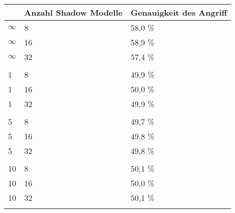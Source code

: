 \begin{table}[!htb]
\centering
\begin{tabular}{lll}
\hline
\rowcolor[HTML]{CBCEFB} 
\multicolumn{1}{|l|}{\cellcolor[HTML]{CBCEFB}Epsilon} &
  \multicolumn{1}{l|}{\cellcolor[HTML]{CBCEFB}Anzahl Shadow Modelle} &
  \multicolumn{1}{l|}{\cellcolor[HTML]{CBCEFB}Genauigkeit des Angriff} \\ \hline
\multicolumn{1}{|l|}{$\infty$} & \multicolumn{1}{l|}{8}  & \multicolumn{1}{l|}{58,0 \%} \\ \hline
\multicolumn{1}{|l|}{$\infty$} & \multicolumn{1}{l|}{16} & \multicolumn{1}{l|}{58,9 \%} \\ \hline
\multicolumn{1}{|l|}{$\infty$} & \multicolumn{1}{l|}{32} & \multicolumn{1}{l|}{57,4 \%} \\ \hline
                               &                         &                              \\ \hline
\multicolumn{1}{|l|}{1}        & \multicolumn{1}{l|}{8}  & \multicolumn{1}{l|}{49,9 \%} \\ \hline
\multicolumn{1}{|l|}{1}        & \multicolumn{1}{l|}{16} & \multicolumn{1}{l|}{50,0 \%} \\ \hline
\multicolumn{1}{|l|}{1}        & \multicolumn{1}{l|}{32} & \multicolumn{1}{l|}{49,9 \%} \\ \hline
                               &                         &                              \\ \hline
\multicolumn{1}{|l|}{5}        & \multicolumn{1}{l|}{8}  & \multicolumn{1}{l|}{49,7 \%} \\ \hline
\multicolumn{1}{|l|}{5}        & \multicolumn{1}{l|}{16} & \multicolumn{1}{l|}{49,8 \%} \\ \hline
\multicolumn{1}{|l|}{5}        & \multicolumn{1}{l|}{32} & \multicolumn{1}{l|}{49,8 \%} \\ \hline
                               &                         &                              \\ \hline
\multicolumn{1}{|l|}{10}       & \multicolumn{1}{l|}{8}  & \multicolumn{1}{l|}{50,1 \%} \\ \hline
\multicolumn{1}{|l|}{10}       & \multicolumn{1}{l|}{16} & \multicolumn{1}{l|}{50,0 \%} \\ \hline
\multicolumn{1}{|l|}{10}       & \multicolumn{1}{l|}{32} & \multicolumn{1}{l|}{50,1 \%} \\ \hline
                               &                         &                              \\ \hline

\end{tabular}
\end{table}
